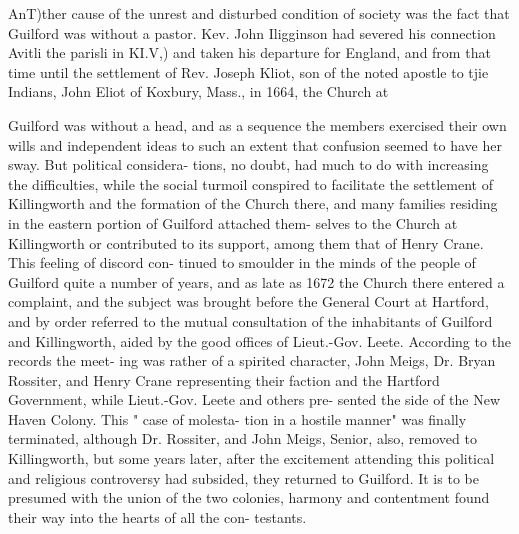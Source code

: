 \documentclass[oneside]{book}
\begin{document}
AnT)ther cause of the unrest and disturbed condition of society 
was the fact that Guilford was without a pastor. Kev. John 
Iligginson had severed his connection Avitli the parisli in KI.V,) and 
taken his departure for England, and from that time until the 
settlement of Rev. Joseph Kliot, son of the noted apostle to tjie 
Indians, John Eliot of Koxbury, Mass., in 1664, the Church at 




Guilford was without a head, and as a sequence the members 
exercised their own wills and independent ideas to such an extent 
that confusion seemed to have her sway. But political considera- 
tions, no doubt, had much to do with increasing the difficulties, 
while the social turmoil conspired to facilitate the settlement of 
Killingworth and the formation of the Church there, and many 
families residing in the eastern portion of Guilford attached them- 
selves to the Church at Killingworth or contributed to its support, 
among them that of Henry Crane. This feeling of discord con- 
tinued to smoulder in the minds of the people of Guilford quite a 
number of years, and as late as 1672 the Church there entered a 
complaint, and the subject was brought before the General Court 
at Hartford, and by order referred to the mutual consultation of 
the inhabitants of Guilford and Killingworth, aided by the good 
offices of Lieut.-Gov. Leete. According to the records the meet- 
ing was rather of a spirited character, John Meigs, Dr. Bryan 
Rossiter, and Henry Crane representing their faction and the 
Hartford Government, while Lieut.-Gov. Leete and others pre- 
sented the side of the New Haven Colony. This " case of molesta- 
tion in a hostile manner" was finally terminated, although Dr. 
Rossiter, and John Meigs, Senior, also, removed to Killingworth, 
but some years later, after the excitement attending this political 
and religious controversy had subsided, they returned to Guilford. 
It is to be presumed with the union of the two colonies, harmony 
and contentment found their way into the hearts of all the con- 
testants. 
\end{document}

